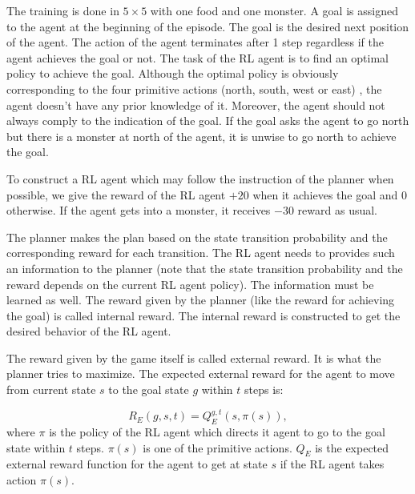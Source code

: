 The training is done in $5 \times 5$ with one food and one monster.
A goal is assigned to the agent at the beginning of the episode. 
The goal is the desired next position of the agent.
The action of the agent terminates after 1 step regardless if the agent achieves the goal 
or not. The task of the RL agent is to find an optimal policy to achieve the goal. 
Although the optimal policy is obviously corresponding to the four primitive actions (north, south, west or east) 
, the agent doesn't have any prior knowledge of it. Moreover, the agent should not always comply to the indication of the goal.
If the goal asks the agent to go north but there is a monster at north of the agent, it is unwise to go north to achieve the goal.

To construct a RL agent which may follow the instruction of the planner when possible, 
we give the reward of the RL agent $+20$ when it achieves the goal and $0$ otherwise.
If the agent gets into a monster, it receives $-30$ reward as usual.

The planner makes the plan based on the state transition probability and the corresponding reward for each transition.
The RL agent needs to provides such an information to the planner (note that the state transition probability and the reward
depends on the current RL agent policy).
The information must be learned as well. 
The reward given by the planner (like the reward for achieving the goal) is called internal reward.
The internal reward is constructed to get the desired behavior of the RL agent.

The reward given by the game itself is called external reward.  It is what the
planner tries to maximize. The expected external reward for the agent to move
from current state $s$ to the goal state $g$ within $t$ steps is:

\begin{equation}
    R_{E}(g, s, t) = Q_{E}^{g, t}(s, \pi(s)), 
\end{equation}
where $\pi$ is the policy of the RL agent which directs it agent to go to the goal state within $t$ steps.
$\pi(s)$ is one of the primitive actions.
$Q_{E}$ is the expected external reward function for the agent to get at state $s$ if 
the RL agent takes action $\pi(s)$.

